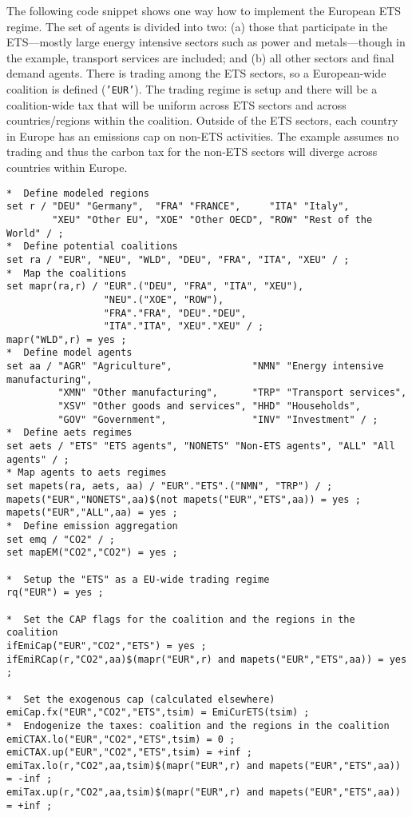 \documentclass[11pt,letterpaper]{report}
\begin{document}
The following code snippet shows one way how to implement the
European ETS regime.  The set of agents is divided into two: (a) those that
participate in the ETS---mostly large energy intensive sectors such as power
and metals---though in the example, transport services are included; and (b)
all other sectors and final demand agents. There is trading among the ETS
sectors, so a European-wide coalition is defined (\texttt{'EUR'}). The trading
regime is setup and there will be a coalition-wide tax that will be uniform
across ETS sectors and across countries/regions within the coalition.
Outside of the ETS sectors, each country in Europe has an
emissions cap on non-ETS activities.
The example assumes no trading and thus the carbon tax for the non-ETS sectors
will diverge across countries within Europe.

\begin{lstlisting}[language=GAMS, caption={Example of ETS regime}]
*  Define modeled regions
set r / "DEU" "Germany",  "FRA" "FRANCE",     "ITA" "Italy",
        "XEU" "Other EU", "XOE" "Other OECD", "ROW" "Rest of the World" / ;
*  Define potential coalitions
set ra / "EUR", "NEU", "WLD", "DEU", "FRA", "ITA", "XEU" / ;
*  Map the coalitions
set mapr(ra,r) / "EUR".("DEU", "FRA", "ITA", "XEU"),
                 "NEU".("XOE", "ROW"),
                 "FRA"."FRA", "DEU"."DEU",
                 "ITA"."ITA", "XEU"."XEU" / ;
mapr("WLD",r) = yes ;
*  Define model agents
set aa / "AGR" "Agriculture",              "NMN" "Energy intensive manufacturing",
         "XMN" "Other manufacturing",      "TRP" "Transport services",
         "XSV" "Other goods and services", "HHD" "Households",
         "GOV" "Government",               "INV" "Investment" / ;
*  Define aets regimes
set aets / "ETS" "ETS agents", "NONETS" "Non-ETS agents", "ALL" "All agents" / ;
* Map agents to aets regimes
set mapets(ra, aets, aa) / "EUR"."ETS".("NMN", "TRP") / ;
mapets("EUR","NONETS",aa)$(not mapets("EUR","ETS",aa)) = yes ;
mapets("EUR","ALL",aa) = yes ;
*  Define emission aggregation
set emq / "CO2" / ;
set mapEM("CO2","CO2") = yes ;

*  Setup the "ETS" as a EU-wide trading regime
rq("EUR") = yes ;

*  Set the CAP flags for the coalition and the regions in the coalition
ifEmiCap("EUR","CO2","ETS") = yes ;
ifEmiRCap(r,"CO2",aa)$(mapr("EUR",r) and mapets("EUR","ETS",aa)) = yes ;

*  Set the exogenous cap (calculated elsewhere)
emiCap.fx("EUR","CO2","ETS",tsim) = EmiCurETS(tsim) ;
*  Endogenize the taxes: coalition and the regions in the coalition
emiCTAX.lo("EUR","CO2","ETS",tsim) = 0 ;
emiCTAX.up("EUR","CO2","ETS",tsim) = +inf ;
emiTax.lo(r,"CO2",aa,tsim)$(mapr("EUR",r) and mapets("EUR","ETS",aa)) = -inf ;
emiTax.up(r,"CO2",aa,tsim)$(mapr("EUR",r) and mapets("EUR","ETS",aa)) = +inf ;


\end{lstlisting}
\end{document}
